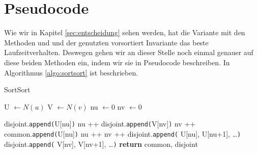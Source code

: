 

\section{Pseudocode}
Wie wir in Kapitel \ref{sec:entscheidung} sehen werden, 
hat die Variante mit den Methoden \SorSor{} und \distr{} und der genutzten vorsortiert
Invariante das beste Laufzeitverhalten. Deswegen gehen wir an dieser Stelle 
noch einmal genauer auf diese beiden Methoden ein, indem wir sie in Pseudocode
beschreiben. In Algorithmus \ref{algo:sortsort} ist \SorSor{} beschrieben.

\begin{algorithm}
  \caption{SortSort}\label{algo:sortsort}
  \begin{algorithmic}[1]
	  \State U $ \gets N(u)$ 
	  \State V $ \gets N(v)$ 
	  \State nu $\gets 0$ 
	  \State nv $\gets 0$ 
      
			\State disjoint.\texttt{append(}U[nu]\texttt{)} 
			\State nu ++
				\State disjoint.\texttt{append(}V[nv]\texttt{)} 
				\State nv ++
				\State common.\texttt{append(}U[nu]\texttt{)} 
				\State nu ++
				\State nv ++
        \EndIf
      \EndWhile
       
			\State disjoint.\texttt{append(} U[nu], U[nu+1], \dots\texttt{)}
			\Else{}
			\State disjoint.\texttt{append(} V[nv], V[nv+1], \dots\texttt{)}
      \EndIf
      \State \textbf{return} common, disjoint
   \EndProcedure
  \end{algorithmic}
  \label{algo:sortsort}
\end{algorithm}



